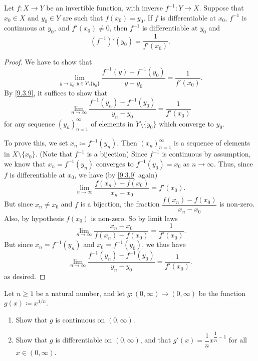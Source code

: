 \begin{thm}\label{10.4.2}
  Let \(f : X \to Y\) be an invertible function, with inverse \(f^{-1} : Y \to X\).
  Suppose that \(x_0 \in X\) and \(y_0 \in Y\) are such that \(f(x_0) = y_0\).
  If \(f\) is differentiable at \(x_0\), \(f^{-1}\) is continuous at \(y_0\), and \(f'(x_0 ) \neq 0\), then \(f^{-1}\) is differentiable at \(y_0\) and
  \[
    (f^{-1})'(y_0) = \dfrac{1}{f'(x_0)}.
  \]
\end{thm}

\begin{proof}
  We have to show that
  \[
    \lim_{y \to y_0 ; y \in Y \setminus \{y_0\}} \dfrac{f^{-1}(y) - f^{-1}(y_0)}{y - y_0} = \dfrac{1}{f'(x_0)}.
  \]
  By \cref{9.3.9}, it suffices to show that
  \[
    \lim_{n \to \infty} \dfrac{f^{-1}(y_n) - f^{-1}(y_0)}{y_n - y_0} = \dfrac{1}{f'(x_0)}
  \]
  for any sequence \((y_n)_{n = 1}^\infty\) of elements in \(Y \setminus \{y_0\}\) which converge to \(y_0\).

  To prove this, we set \(x_n \coloneqq f^{-1}(y_n)\).
  Then \((x_n)_{n = 1}^\infty\) is a sequence of elements in \(X \setminus \{x_0\}\).
  (Note that \(f^{-1}\) is a bijection)
  Since \(f^{-1}\) is continuous by assumption, we know that \(x_n = f^{-1}(y_n)\) converges to \(f^{-1}(y_0) = x_0\) as \(n \to \infty\).
  Thus, since \(f\) is differentiable at \(x_0\), we have (by \cref{9.3.9} again)
  \[
    \lim_{n \to \infty} \dfrac{f(x_n) - f(x_0)}{x_n - x_0} = f'(x_0).
  \]
  But since \(x_n \neq x_0\) and \(f\) is a bijection, the fraction \(\dfrac{f(x_n) - f(x_0)}{x_n - x_0}\) is non-zero.
  Also, by hypothesis \(f(x_0)\) is non-zero.
  So by limit laws
  \[
    \lim_{n \to \infty} \dfrac{x_n - x_0}{f(x_n) - f(x_0)} = \dfrac{1}{f'(x_0)}.
  \]
  But since \(x_n = f^{-1}(y_n)\) and \(x_0 = f^{-1}(y_0)\), we thus have
  \[
    \lim_{n \to \infty} \dfrac{f^{-1}(y_n) - f^{-1}(y_0)}{y_n - y_0} = \dfrac{1}{f'(x_0)}.
  \]
  as desired.
\end{proof}

\exercisesection

\begin{ex}\label{ex:10.4.1}
  Let \(n \geq 1\) be a natural number, and let \(g : (0, \infty) \to (0, \infty)\) be the function \(g(x) \coloneqq x^{1 / n}\).
  \begin{enumerate}
    \item Show that \(g\) is continuous on \((0, \infty)\).
    \item Show that \(g\) is differentiable on \((0, \infty)\), and that \(g'(x) = \dfrac{1}{n} x^{\dfrac{1}{n} - 1}\) for all \(x \in (0, \infty)\).
  \end{enumerate}
\end{ex}

